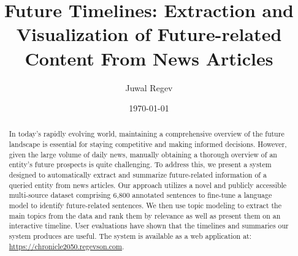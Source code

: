 \documentclass[a4paper,10pt]{report} %
\title{Future Timelines: Extraction and Visualization of Future-related Content From News Articles}
\author{Juwal Regev}
\date{\today} %
\begin{document}
\maketitle

\begin{abstract}
In today's rapidly evolving world, maintaining a comprehensive overview of the future landscape is essential for staying competitive and making informed decisions. However, given the large volume of daily news, manually obtaining a thorough overview of an entity's future prospects is quite challenging. To address this, we present a system designed to automatically extract and summarize future-related information of a queried entity from news articles. Our approach utilizes a novel and publicly accessible multi-source dataset comprising 6,800 annotated sentences to fine-tune a language model to identify future-related sentences. We then use topic modeling to extract the main topics from the data and rank them by relevance as well as present them on an interactive timeline. User evaluations have shown that the timelines and summaries our system produces are useful. The system is available as a web application at: \url{https://chronicle2050.regevson.com}.
\end{abstract}

\tableofcontents

\end{document}
